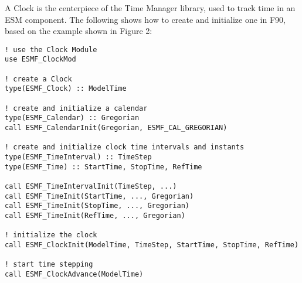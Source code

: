 
A Clock is the centerpiece of the Time Manager library, used to track time
in an ESM component.  The following shows how to create and initialize one
in F90, based on the example shown in Figure 2:

\begin{verbatim}
! use the Clock Module
use ESMF_ClockMod

! create a Clock
type(ESMF_Clock) :: ModelTime

! create and initialize a calendar
type(ESMF_Calendar) :: Gregorian
call ESMF_CalendarInit(Gregorian, ESMF_CAL_GREGORIAN)

! create and initialize clock time intervals and instants
type(ESMF_TimeInterval) :: TimeStep
type(ESMF_Time) :: StartTime, StopTime, RefTime

call ESMF_TimeIntervalInit(TimeStep, ...)
call ESMF_TimeInit(StartTime, ..., Gregorian)
call ESMF_TimeInit(StopTime, ..., Gregorian)
call ESMF_TimeInit(RefTime, ..., Gregorian)

! initialize the clock
call ESMF_ClockInit(ModelTime, TimeStep, StartTime, StopTime, RefTime)

! start time stepping
call ESMF_ClockAdvance(ModelTime)
\end{verbatim}
